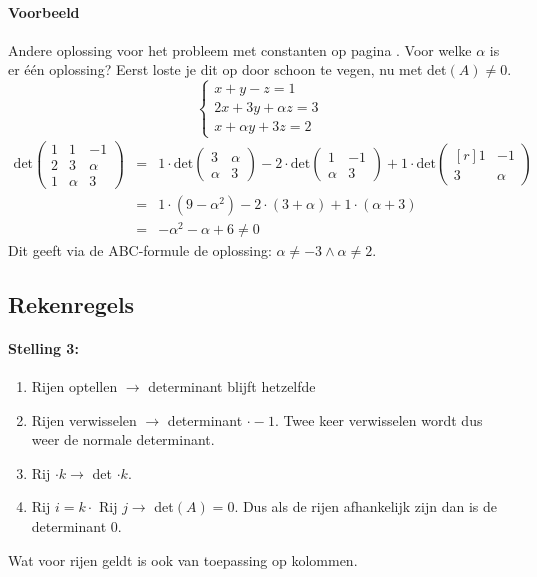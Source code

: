 \paragraph{Voorbeeld} Andere oplossing voor het probleem met constanten op pagina  \pageref{par:constantenprobleem}. Voor welke $\alpha$ is er \'e\'en oplossing? Eerst loste je dit op door schoon te vegen, nu met det$(A) \neq 0$.
\[ \left\{\begin{array}{l}
	x + y - z = 1 \\
	2x + 3y + \alpha z = 3 \\
	x + \alpha y + 3z = 2
\end{array}\right. \]
\begin{eqnarray*}
	\mbox{det} \left(\!\begin{array}{r|rr}
		1 & 1 & -1 \\
		2 & 3 & \alpha \\
		1 & \alpha & 3
	\end{array}\!\right) &=& 1 \cdot \mbox{det} \begin{pmatrix} 3 & \alpha \\ \alpha & 3 \end{pmatrix} - 2 \cdot \mbox{det} \begin{pmatrix*} 1 & -1 \\ \alpha & 3 \end{pmatrix*} + 1 \cdot \mbox{det} \begin{pmatrix*}[r] 1 & -1 \\ 3 & \alpha \end{pmatrix*} \\
	&=& 1 \cdot (9 - \alpha^2) - 2 \cdot (3 + \alpha) + 1 \cdot (\alpha +3) \\
	&=& -\alpha^2 - \alpha + 6 \neq 0
\end{eqnarray*}
Dit geeft via de ABC-formule de oplossing: $\alpha \neq -3 \wedge \alpha \neq 2$.

\subsection{Rekenregels}
\paragraph{Stelling 3:} 
\begin{enumerate}
	\item Rijen optellen $\to$ determinant blijft hetzelfde
	\item Rijen verwisselen $\to$ determinant $\cdot -1$. Twee keer verwisselen wordt dus weer de normale determinant.
	\item Rij $\cdot k \to$ det $\cdot k$.
	\item Rij $i = k \cdot$ Rij $j \to$ det$(A) = 0$. Dus als de rijen afhankelijk zijn dan is de determinant 0.
\end{enumerate}
Wat voor rijen geldt is ook van toepassing op kolommen.

